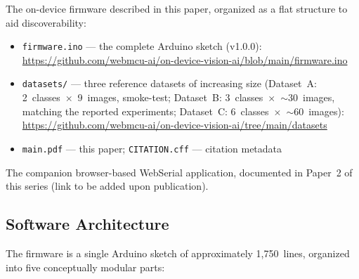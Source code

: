 \documentclass[12pt]{article}
\begin{document}
\begin{description}[leftmargin=2em, style=nextline]
  \item[\texttt{on-device-vision-ai}]
    The on-device firmware described in this paper,
    organized as a flat structure to aid discoverability:
    \begin{itemize}[nosep]
      \item \texttt{firmware.ino} --- the complete Arduino sketch (v1.0.0):\\
            \url{https://github.com/webmcu-ai/on-device-vision-ai/blob/main/firmware.ino}
      \item \texttt{datasets/} --- three reference datasets of increasing size
            (Dataset~A: 2~classes~$\times$~9~images, smoke-test; Dataset~B:
            3~classes~$\times$~$\sim$30~images, matching the reported experiments;
            Dataset~C: 6~classes~$\times$~$\sim$60~images):\\
            \url{https://github.com/webmcu-ai/on-device-vision-ai/tree/main/datasets}
      \item \texttt{main.pdf} --- this paper;
            \texttt{CITATION.cff} --- citation metadata
    \end{itemize}
  \item[\texttt{webmcu-vision-web}]
    The companion browser-based WebSerial application, documented in Paper~2
    of this series (link to be added upon publication).
\end{description}

\subsection{Software Architecture}
\label{subsec:software}

The firmware is a single Arduino sketch of approximately 1,750~lines, organized
into five conceptually modular parts:
\end{document}
